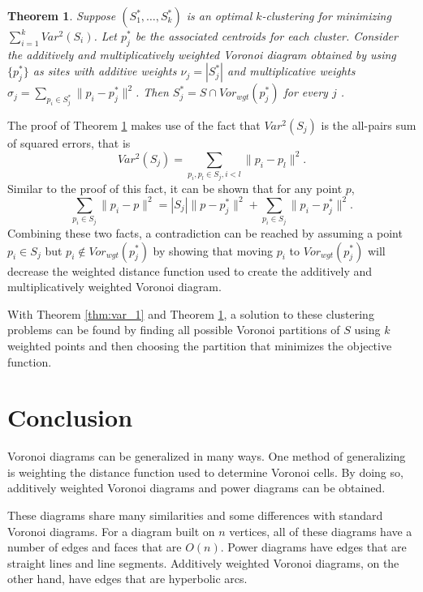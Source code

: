 \documentclass[a4paper, 11pt]{article}
\newtheorem{theorem}{Theorem}[section]
\begin{document}
\begin{theorem}
  \label{thm:var_2}
  Suppose $(S_1^\ast, \dots, S_k^\ast)$ is an optimal $k$-clustering for minimizing $\sum_{i=1}^k Var^2(S_i)$. Let $p_j^\ast$ be the associated
  centroids for each cluster. Consider the additively and multiplicatively weighted Voronoi diagram obtained by using $\{ p_j^\ast \}$ as sites with
  additive weights $\nu_j = |S_j^\ast|$ and multiplicative weights $\sigma_j = \sum_{p_i \in S_j^\ast} \| p_i - p_j^\ast \|^2$. Then $S_j^\ast =
  S \cap Vor_{wgt}(p_j^\ast)$ for every $j$ \cite{inaba_clustering}.
\end{theorem}

The proof of Theorem \ref{thm:var_2} makes use of the fact that $Var^2(S_j)$ is the all-pairs sum of squared errors, that is
\begin{equation}
  Var^2(S_j) = \sum_{p_i, p_l \in S_j, i<l} \|p_i - p_l\|^2.
  \label{eq:all_sums}
\end{equation}
Similar to the proof of this fact, it can be shown that for any point $p$,
\begin{equation}
  \sum_{p_i \in S_j} \| p_i - p \|^2 = |S_j| \|p - p_j^\ast\|^2 + \sum_{p_i \in S_j} \| p_i - p_j^\ast \|^2.
  \label{eq:wgt_vor}
\end{equation}
Combining these two facts, a contradiction can be reached by assuming a point $p_i \in S_j$ but $p_i \not\in Vor_{wgt}(p_j^\ast)$ by showing that
moving $p_i$ to $Vor_{wgt}(p_j^\ast)$ will decrease the weighted distance function used to create the additively and multiplicatively weighted Voronoi
diagram.

With Theorem \ref{thm:var_1} and Theorem \ref{thm:var_2}, a solution to these clustering problems can be found by finding all possible Voronoi
partitions of $S$ using $k$ weighted points and then choosing the partition that minimizes the objective function.

\section{Conclusion}

Voronoi diagrams can be generalized in many ways. One method of generalizing is weighting the distance function used to determine Voronoi cells. By
doing so, additively weighted Voronoi diagrams and power diagrams can be obtained.

These diagrams share many similarities and some differences with standard Voronoi diagrams. For a diagram built on $n$ vertices, all of these diagrams
have a number of edges and faces that are $O(n)$. Power diagrams have edges that are straight lines and line segments. Additively weighted Voronoi
diagrams, on the other hand, have edges that are hyperbolic arcs.
\end{document}
